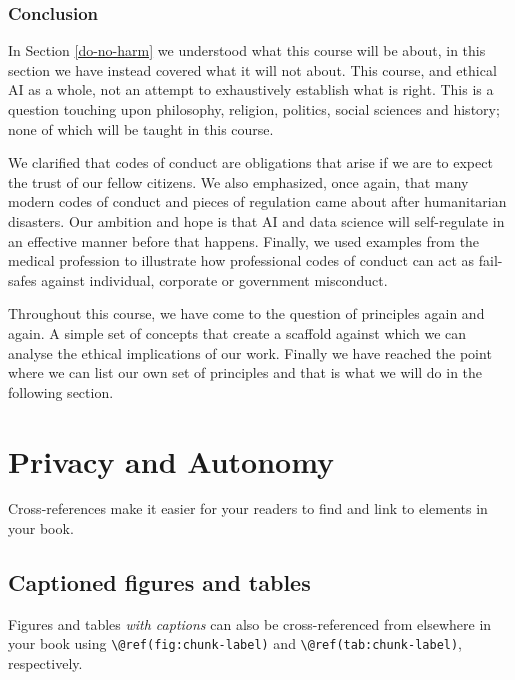 \documentclass[
]{book}
\theoremstyle{definition}
\theoremstyle{definition}
\theoremstyle{definition}
\theoremstyle{definition}
\theoremstyle{remark}
\begin{document}
\hypertarget{conclusion-2}{%
\subsection{Conclusion}\label{conclusion-2}}

In Section \ref{do-no-harm} we understood what this course will be about, in this section we have instead covered what it will not about. This course, and ethical AI as a whole, not an attempt to exhaustively establish what is right. This is a question touching upon philosophy, religion, politics, social sciences and history; none of which will be taught in this course.

We clarified that codes of conduct are obligations that arise if we are to expect the trust of our fellow citizens. We also emphasized, once again, that many modern codes of conduct and pieces of regulation came about after humanitarian disasters. Our ambition and hope is that AI and data science will self-regulate in an effective manner before that happens. Finally, we used examples from the medical profession to illustrate how professional codes of conduct can act as fail-safes against individual, corporate or government misconduct.

Throughout this course, we have come to the question of principles again and again. A simple set of concepts that create a scaffold against which we can analyse the ethical implications of our work. Finally we have reached the point where we can list our own set of principles and that is what we will do in the following section.

\hypertarget{ch-privacy-and-autonomy}{%
\chapter{Privacy and Autonomy}\label{ch-privacy-and-autonomy}}

Cross-references make it easier for your readers to find and link to elements in your book.

\hypertarget{captioned-figures-and-tables}{%
\section{Captioned figures and tables}\label{captioned-figures-and-tables}}

Figures and tables \emph{with captions} can also be cross-referenced from elsewhere in your book using \texttt{\textbackslash{}@ref(fig:chunk-label)} and \texttt{\textbackslash{}@ref(tab:chunk-label)}, respectively.
\end{document}
